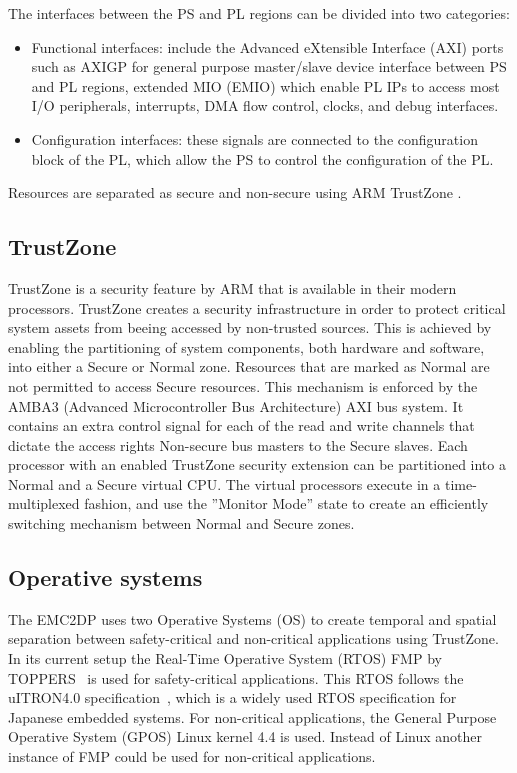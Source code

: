 The interfaces between the PS and PL regions can be divided into two categories: 
\begin{itemize}
\item Functional interfaces: include the Advanced eXtensible Interface (AXI) ports such as AXIGP for general purpose master/slave device interface between PS and PL regions, extended MIO (EMIO) which enable PL IPs to access most I/O peripherals, interrupts, DMA flow control, clocks, and debug interfaces.
\item Configuration interfaces: these signals are connected to the configuration block of the PL, which allow the PS to control the configuration of the PL. %
\end{itemize}

Resources are separated as secure and non-secure using ARM TrustZone \cite{website:ARM}.\\

\subsection{TrustZone}
\label{sec:trustzone}
TrustZone is a security feature by ARM that is available in their modern processors. TrustZone creates a security infrastructure in order to protect critical system assets from beeing accessed by non-trusted sources. This is achieved by enabling the partitioning of system components, both hardware and software, into either a Secure or Normal zone. Resources that are marked as Normal are not permitted to access Secure resources. This mechanism is enforced by the AMBA3 (Advanced Microcontroller Bus Architecture) AXI bus system. It contains an extra control signal for each of the read and write channels that dictate the access rights Non-secure bus masters to the Secure slaves. Each processor with an enabled TrustZone security extension can be partitioned into a Normal and a Secure virtual CPU. The virtual processors execute in a time-multiplexed fashion, and use the ”Monitor Mode” state to create an efficiently switching mechanism between Normal and Secure zones.~\cite{zaki2016} \\ %

\subsection{Operative systems}
The EMC2DP uses two Operative Systems (OS) to create temporal and spatial separation between safety-critical and non-critical applications using TrustZone. In its current setup the Real-Time Operative System (RTOS) FMP by TOPPERS~\cite{website:FMP} is used for safety-critical applications. This RTOS follows the uITRON4.0 specification~\cite{uitron}, which is a widely used RTOS specification for Japanese embedded systems. For non-critical applications, the General Purpose Operative System (GPOS) Linux kernel 4.4 is used. Instead of Linux another instance of FMP could be used for non-critical applications.\\


